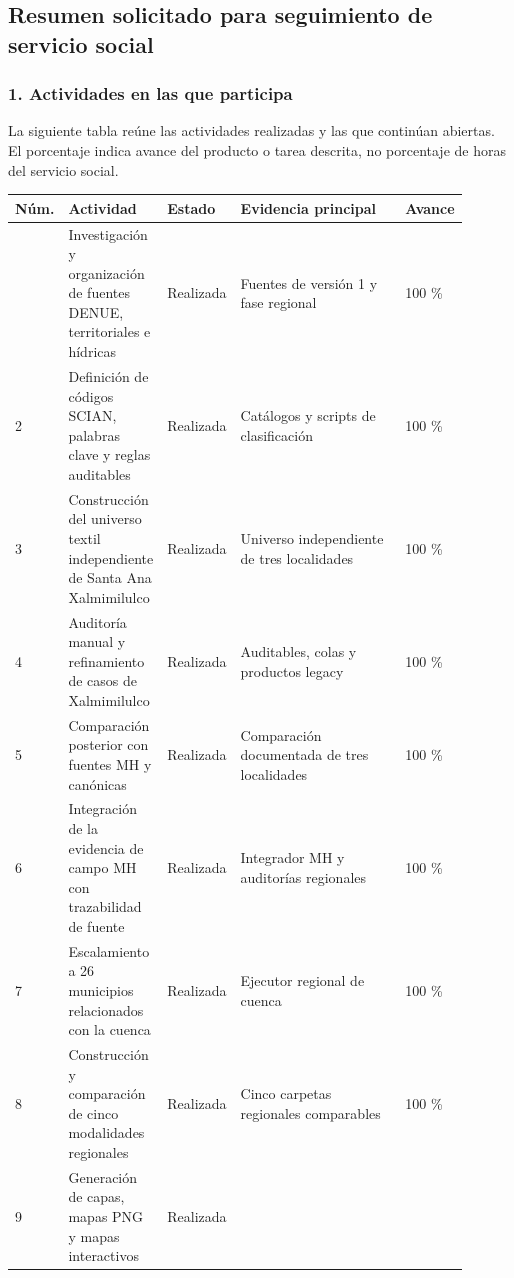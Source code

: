 \documentclass[
  spanish,
]{article}
\newcounter{none} %
\begin{document}
\subsection{Resumen solicitado para seguimiento de servicio
social}\label{resumen-solicitado-para-seguimiento-de-servicio-social}

\subsubsection{1. Actividades en las que
participa}\label{1-actividades-en-las-que-participa}

La siguiente tabla reúne las actividades realizadas y las que continúan
abiertas. El porcentaje indica avance del producto o tarea descrita, no
porcentaje de horas del servicio social.

{\def\LTcaptype{none} %
\begin{longtable}[]{@{}p{0.04\linewidth}p{0.20\linewidth}p{0.11\linewidth}p{0.45\linewidth}p{0.10\linewidth}@{}}
\toprule\noalign{}
Núm. & Actividad & Estado & Evidencia principal & Avance \\
\midrule\noalign{}
\endhead
\bottomrule\noalign{}
\endlastfoot
1 & Investigación y organización de fuentes DENUE, territoriales e
hídricas & Realizada & Fuentes de versión 1 y fase regional
& 100 \% \\
2 & Definición de códigos SCIAN, palabras clave y reglas auditables &
Realizada & Catálogos y scripts de clasificación & 100 \% \\
3 & Construcción del universo textil independiente de Santa Ana
Xalmimilulco & Realizada &
Universo independiente de tres localidades &
100 \% \\
4 & Auditoría manual y refinamiento de casos de Xalmimilulco & Realizada
& Auditables, colas y productos legacy & 100 \% \\
5 & Comparación posterior con fuentes MH y canónicas & Realizada &
Comparación documentada de tres localidades & 100 \% \\
6 & Integración de la evidencia de campo MH con trazabilidad de fuente &
Realizada & Integrador MH y auditorías regionales
& 100 \% \\
7 & Escalamiento a 26 municipios relacionados con la cuenca & Realizada
& Ejecutor regional de cuenca & 100 \% \\
8 & Construcción y comparación de cinco modalidades regionales &
Realizada & Cinco carpetas regionales comparables & 100
\% \\
9 & Generación de capas, mapas PNG y mapas interactivos & Realizada &

\end{longtable}}
\end{document}
